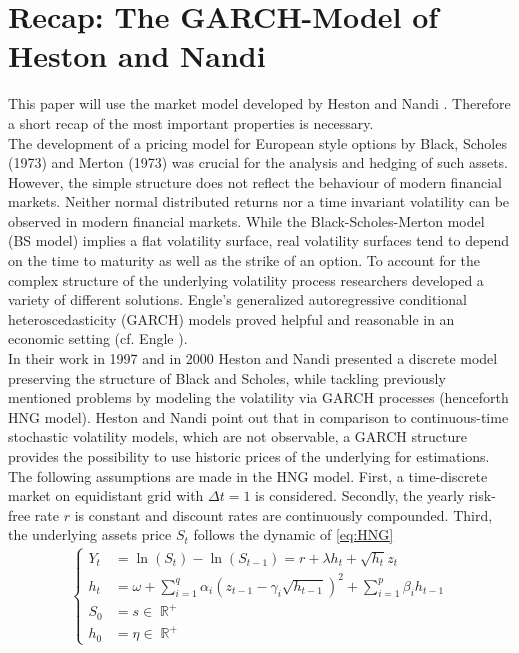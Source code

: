 \documentclass{article}
\DeclareMathOperator{\R}{\mathbb{R}}
\begin{document}
\section{Recap: The GARCH-Model of Heston and Nandi}\label{sec:HNG}
This paper will use the market model developed by Heston and Nandi \cite{HestonNandi}. Therefore a short recap of the most important properties is necessary. \\
The development of a pricing model for European style options by Black, Scholes (1973) and Merton (1973) was crucial for the analysis and hedging of such assets. However, the simple structure does not reflect the behaviour of modern financial markets. Neither normal distributed returns nor a time invariant volatility can be observed in modern financial markets. While the Black-Scholes-Merton model (BS model) implies a flat volatility surface, real volatility surfaces tend to depend on the time to maturity as well as the strike of an option. To account for the complex structure of the underlying volatility process researchers developed a variety of different solutions. Engle's generalized autoregressive  conditional heteroscedasticity (GARCH) models  proved helpful and reasonable in an economic setting (cf. Engle \cite{EngleGARCH}). \\
In their work \cite{HestonNandi97} in 1997 and \cite{HestonNandi} in 2000 Heston and Nandi presented a discrete model  preserving the structure of Black and Scholes, while tackling previously mentioned problems by modeling the volatility via GARCH processes (henceforth HNG model). Heston and Nandi point out that in comparison to continuous-time stochastic volatility models, which are not observable,  a GARCH structure provides the possibility to use historic prices of the underlying for estimations.\\
The following assumptions are made in the HNG model. First, a time-discrete market on equidistant grid with \mbox{$\Delta t = 1$} is considered. Secondly, the yearly risk-free rate $r$ is constant and discount rates are continuously compounded.
Third, the underlying assets price $S_t$ follows the dynamic of \eqref{eq:HNG}
\begin{align}
\begin{cases}
Y_t&=\ln(S_t)-\ln(S_{t-1}) =r+\lambda h_t+\sqrt{h_t}z_t\\
    h_t &= \omega+\sum\limits_{i=1}^q \alpha_i \left( z_{t-1}-\gamma_i \sqrt{h_{t-1}}\right)^2+\sum\limits_{i=1}^p\beta_i h_{t-1}\\
S_0&=s\in \R^+\\
h_0&=\eta\in \R^+\label{eq:HNG}
\end{cases}
\end{align}
\end{document}
